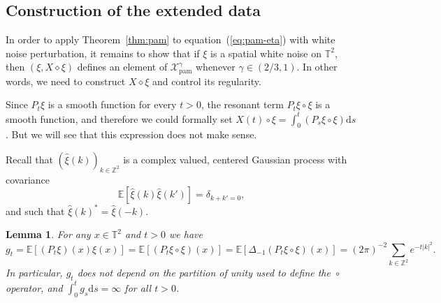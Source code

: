 \documentclass[a4paper,11pt]{article}
\newcommand{\mathd}{\mathrm{d}}
\newcommand{\tmop}[1]{\ensuremath{\operatorname{#1}}}
\newtheorem{lemma}{Lemma}
{\theorembodyfont{\rmfamily}\newtheorem{remark}{Remark}}
\newcommand{\reso}{\,\mathord{\circ}\,}
\newcommand{\renorm}{\,\mathord{\diamond}\,}
\begin{document}
\subsection{Construction of the extended data}

In order to apply Theorem~\ref{thm:pam} to equation~(\ref{eq:pam-eta}) with
white noise perturbation, it remains to show that if $\xi$ is a spatial white
noise on $\mathbb{T}^2$, then $(\xi, X\diamond \xi)$ defines an element of
$\mathcal{X}_{\tmop{pam}}^\gamma$ whenever $\gamma \in (2/3,1)$. In other words, we need to construct $X \renorm
\xi$ and control its regularity.

Since $P_t \xi$ is a smooth function for every $t > 0$, the resonant term $P_t
\xi \reso \xi$ is a smooth function, and therefore we could formally set $X(t)
\reso \xi = \int_0^{t} (P_s \xi \reso \xi) \mathd s$. But we will see
that this expression does not make sense.

Recall that $(\hat{\xi} (k))_{k \in \mathbb{Z}^2}$ is a complex valued,
centered Gaussian process with covariance
\begin{equation}
  \label{eq:wn covariance} \mathbb{E} [\hat{\xi} (k) \hat{\xi} (k')] =
  \delta_{k + k' = 0},
\end{equation}
and such that $\hat{\xi} (k)^{\ast} = \hat{\xi} (- k)$.

\begin{lemma}
  \label{l:anderson area expectation} For any $x \in \mathbb{T}^2$ and $t > 0$
  we have
  \[ g_t =\mathbb{E} [(P_t \xi)(x) \xi (x)]  = \mathbb{E} [(P_t \xi \reso \xi) (x)] =\mathbb{E} [\Delta_{- 1}
     (P_t \xi \reso \xi) (x)] = (2 \pi)^{- 2} \sum_{k \in \mathbb{Z}^2} e^{- t
     |k|^2} . \]
  In particular, $g_t$ does not depend on the partition of unity used to
  define the $\reso$ operator, and $\int_0^t g_s \mathd s = \infty$ for all $t
  > 0$.
\end{lemma}
\end{document}

